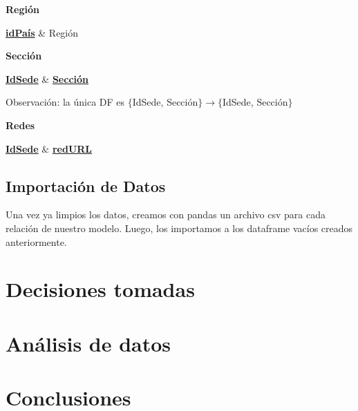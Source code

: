 \documentclass[10pt,a4paper]{article}
\begin{document}
\textbf{Región} 
\vspace{0.1cm}

\begin{dependency}
    \raggedright
    \begin{deptext}[TxtBook] %
        \textbf{\underline{idPaís}} \& Región  \\
    \end{deptext}
\end{dependency} 

\vspace{3mm}
\textbf{Sección} 

\begin{dependency}
    \raggedright
    \begin{deptext}[TxtBook] %
        \textbf{\underline{IdSede}}  \& \textbf{\underline{Sección}}  \\
    \end{deptext}
\end{dependency} \vspace{0.1cm}

Observación: la única DF es $\{$IdSede, Sección$\} \rightarrow \{$IdSede, Sección$\}$

\vspace{3mm}
\textbf{Redes} 

\begin{dependency}
    \raggedright
    \begin{deptext}[TxtBook] %
        \textbf{\underline{IdSede}}  \& \textbf{\underline{redURL}}  \\
    \end{deptext}
\end{dependency} \vspace{0.3cm}

\subsection{Importación de Datos} \vspace{0.3cm}

Una vez ya limpios los datos, creamos con pandas un archivo csv para cada relación de nuestro modelo. Luego, los importamos 
a los dataframe vacíos creados anteriormente.

\section{Decisiones tomadas}


\section{Análisis de datos}


\section{Conclusiones}
\end{document}
